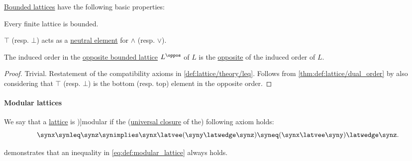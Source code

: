 \begin{proposition}\label{thm:def:bounded_lattice}
  \hyperref[def:bounded_lattice]{Bounded lattices} have the following basic properties:
  \begin{thmenum}
     Every finite lattice is bounded.

     \( \top \) (resp. \( \bot \)) acts as a \hyperref[def:semigroup_neutral_element]{neutral element} for \( \wedge \) (resp. \( \vee \)).

     The induced order in the \hyperref[def:bounded_lattice/opposite]{opposite bounded lattice} \( L^\oppos \) of \( L \) is the \hyperref[def:partially_ordered_set/opposite]{opposite} of the induced order of \( L \).
  \end{thmenum}
\end{proposition}
\begin{proof}
   Trivial.
   Restatement of the compatibility axioms in \cref{def:lattice/theory/leq}.
   Follows from \cref{thm:def:lattice/dual_order} by also considering that \( \top \) (resp. \( \bot \)) is the bottom (resp. top) element in the opposite order.
\end{proof}

\paragraph{Modular lattices}

\begin{definition}\label{def:modular_lattice}
  We say that a \hyperref[def:lattice]{lattice} is \term[ru=модулярная (решётка) (\cite[def. 4.6]{Гуров2013ТеорияРешёток})]{modular} if the (\hyperref[def:fol_quantifier_closure]{universal closure} of the) following axiom holds:
  \begin{equation}\label{eq:def:modular_lattice}
    \synx \synleq \synz \synimplies \synx \latvee (\syny \latwedge \synz) \syneq (\synx \latvee \syny) \latwedge \synz.
  \end{equation}
\end{definition}
\begin{comments}
  \item {} demonstrates that an inequality in \eqref{eq:def:modular_lattice} always holds.
\end{comments}

